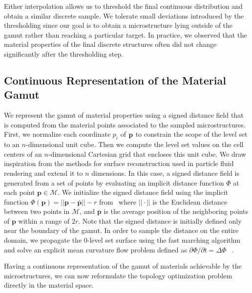 Either interpolation allows us to threshold the final continuous distribution and obtain a similar discrete sample. We tolerate small deviations introduced by the thresholding since our goal is to obtain a microstructure lying outside of the gamut rather than reaching a particular target. In practice, we observed that the material properties of the final discrete structures often did not change significantly after the thresholding step. 

\subsection{Continuous Representation of the Material Gamut }\label{sec:ls}
We represent the gamut of material properties using a signed distance field that is computed from the material points associated to the sampled microstructures.
First, we normalize each coordinate $p_i$ of $\bf p$ to constrain the scope of the level set to an $n$-dimensional unit cube. Then we compute the level set values on the cell centers of an $n$-dimensional Cartesian grid that encloses this unit cube. We draw inspiration from the methods for surface reconstruction used in particle fluid rendering \cite{zhu2005animating,bhatacharya2011level,ando2013highly} and extend it to $n$ dimensions. In this case, a signed distance field is generated from a set of points by evaluating an implicit distance function $\Phi$ at each point $\mathbf{p}\in\mathcal{M}$.
We initialize the signed distance field using the implicit function $\Phi(\mathbf{p})=||\mathbf{p}-\bar{\mathbf{p}}||-r$ from~\citet{zhu2005animating} where $||\cdot||$ is the Euclidean distance between two points in $\mathcal{M}$, and $\bar{\mathbf{p}}$ is the average position of the neighboring points of $\mathbf{p}$ within a range of $2r$. Note that the signed distance is initially defined only near the boundary of the gamut. In order to sample the distance on the entire domain, we propagate the 0-level set surface using the fast marching algorithm and solve an explicit mean curvature flow problem defined as $\partial \Phi / \partial t = \Delta \Phi$~\citep{osher2006level} .

Having a continuous representation of the gamut of materials achievable by the microstructures, we can now reformulate the topology optimization problem directly in the material space.
